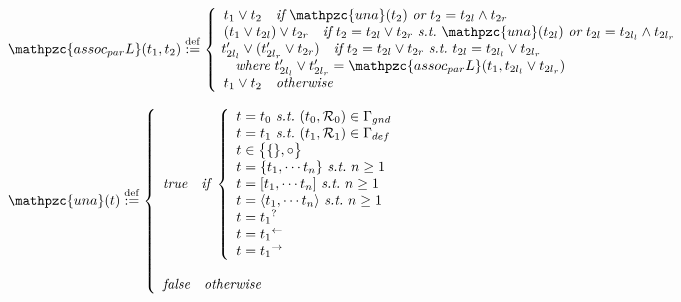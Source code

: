 \documentclass[12pt]{article}
\begin{document}
\begin{displaymath}
\begin{array}{l}
    \mathpzc{assoc_{par}L}(t_1, t_2) \stackrel{\mathrm{def}}{:=}
     \left\{\begin{array}{l}
       t_1 \vee t_2 \quad \text{\it if}\ \mathpzc{una}(t_2)\
        \text{\it or}\ t_2 = t_{2l} \wedge t_{2r}  \\
       (t_{1} \vee t_{2l}) \vee t_{2r} \quad \text{\it if}\
        t_2 = t_{2l} \vee t_{2r}\ \text{\it s.t.}\
         \mathpzc{una}(t_{2l})\ \text{\it or}\
          t_{2l} = t_{{2l}_l} \wedge t_{{2l}_r}  \\
       \!\!\!\!\begin{array}[t]{l}
         t'_{{2l}_l} \vee (t'_{{2l}_r} \vee t_{2r}) \quad
          \text{\it if}\ t_2 = t_{2l} \vee t_{2r}\ \text{\it s.t.}\
           t_{2l} = t_{{2l}_l} \vee t_{{2l}_r}  \\
         
         \quad \text{\it where}\
          t'_{{2l}_l} \vee t'_{{2l}_r} = \mathpzc{assoc_{par}L}(
           t_1, t_{{2l}_l} \vee t_{{2l}_r})
       \end{array}  \\
       
       t_1 \vee t_2 \quad \text{\it otherwise}
     \end{array}\right.  \\
    \\
    
    \mathpzc{una}(t) \stackrel{\mathrm{def}}{:=} \left\{\begin{array}{l}
      \text{\it true}\quad \text{\it if}\
       \left\{\begin{array}{l}
         t = t_0\ \text{\it s.t.}\ (t_0, \mathcal{R}_0) \in \Gamma_{gnd}  \\
         t = t_1\ \text{\it s.t.}\ (t_1, \mathcal{R}_1) \in \Gamma_{def}  \\
         t \in \bigl\{\{\}, \circ \bigr\}  \\
         t = \{t_1, \cdots t_n\}\ \text{\it s.t.}\ n \ge 1  \\
         t = [t_1, \cdots t_n]\ \text{\it s.t.}\ n \ge 1  \\
         t = \langle t_1, \cdots t_n \rangle\ \text{\it s.t.}\ n \ge 1  \\
         t = {t_1}^?  \\
         t = {t_1}^\leftarrow  \\
         t = {t_1}^\rightarrow
       \end{array}\right.  \\
       \\
       \text{\it false}\quad \text{\it otherwise}
    \end{array}\right.
    
  \end{array}
\end{displaymath}
\end{document}
